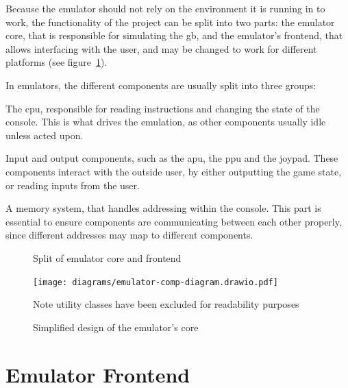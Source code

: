 \documentclass[11pt]{informatics-report}
\begin{document}
Because the emulator should not rely on the environment it is running in to work, the functionality of the project can be split into two parts: the emulator core, that is responsible for simulating the \glsdesc{gb}, and the emulator's frontend, that allows interfacing with the user, and may be changed to work for different platforms (see figure~\ref{fig:emu-back-front-split-uml}).

In emulators, the different components are usually split into three groups:
\begin{compactitem}
	\item The \gls{cpu}, responsible for reading instructions and changing the state of the console. This is what drives the emulation, as other components usually idle unless acted upon.
	\item Input and output components, such as the \gls{apu}, the \gls{ppu} and the joypad. These components interact with the outside user, by either outputting the game state, or reading inputs from the user.
	\item A memory system, that handles addressing within the console. This part is essential to ensure components are communicating between each other properly, since different addresses may map to different components.
\end{compactitem}

\begin{figure}[h]
    \centering
    \caption{Split of emulator core and frontend}
    \label{fig:emu-back-front-split-uml}
\end{figure}

\begin{figure}[h]
    \centering
    \texttt{[image: diagrams/emulator-comp-diagram.drawio.pdf]}
    \caption{Simplified design of the emulator's core}
    Note utility classes have been excluded for readability purposes
    \label{fig:emu-core-components}
\end{figure}


\section{Emulator Frontend}
\end{document}
